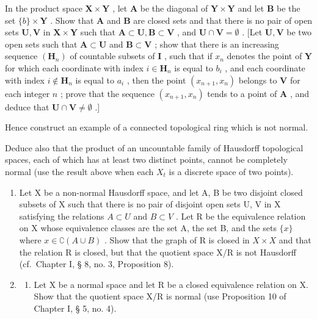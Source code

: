 In the product space \(\mathbf{X} \times \mathbf{Y}\) , let \(\mathbf{A}\) be the diagonal of \(\mathbf{Y} \times \mathbf{Y}\) and let \(\mathbf{B}\) be the set \(\{b\} \times \mathbf{Y}\) . Show that \(\mathbf{A}\) and \(\mathbf{B}\) are closed sets and that there is no pair of open sets \(\mathbf{U}, \mathbf{V}\) in \(\mathbf{X} \times \mathbf{Y}\) such that \(\mathbf{A} \subset \mathbf{U}, \mathbf{B} \subset \mathbf{V}\) , and \(\mathbf{U} \cap \mathbf{V} = \emptyset\) . {[}Let \(\mathbf{U}, \mathbf{V}\) be two open sets such that \(\mathbf{A} \subset \mathbf{U}\) and \(\mathbf{B} \subset \mathbf{V}\) ; show that there is an increasing sequence \((\mathbf{H}_n)\) of countable subsets of \(\mathbf{I}\) , such that if \(x_n\) denotes the point of \(\mathbf{Y}\) for which each coordinate with index \(i \in \mathbf{H}_n\) is equal to \(b_i\) , and each coordinate with index \(i \notin \mathbf{H}_n\) is equal to \(a_i\) , then the point \((x_{n+1}, x_n)\) belongs to \(\mathbf{V}\) for each integer \(n\) ; prove that the sequence \((x_{n+1}, x_n)\) tends to a point of \(\mathbf{A}\) , and deduce that \(\mathbf{U} \cap \mathbf{V} \neq \emptyset\) .{]}

Hence construct an example of a connected topological ring which is not normal.

Deduce also that the product of an uncountable family of Hausdorff topological spaces, each of which has at least two distinct points, cannot be completely normal (use the result above when each \(X_{t}\) is a discrete space of two points).

\begin{enumerate}
\def\labelenumi{\arabic{enumi})}
\setcounter{enumi}{13}
\item
  Let X be a non-normal Hausdorff space, and let A, B be two disjoint closed subsets of X such that there is no pair of disjoint open sets U, V in X satisfying the relations \(A \subset U\) and \(B \subset V\) . Let R be the equivalence relation on X whose equivalence classes are the set A, the set B, and the sets \(\{x\}\) where \(x \in \complement(A \cup B)\) . Show that the graph of R is closed in \(X \times X\) and that the relation R is closed, but that the quotient space X/R is not Hausdorff (cf.~Chapter I, § 8, no. 3, Proposition 8).
\item
  \begin{enumerate}
  \def\labelenumii{\alph{enumii})}
  \tightlist
  \item
    Let X be a normal space and let R be a closed equivalence relation on X. Show that the quotient space X/R is normal (use Proposition 10 of Chapter I, § 5, no. 4).
  \end{enumerate}
\end{enumerate}


